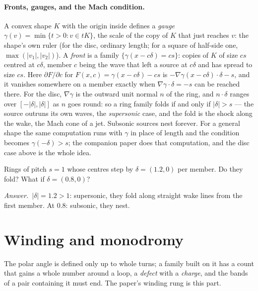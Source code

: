\documentclass[10pt]{article}
\theoremstyle{plain}
\theoremstyle{definition}
\newcommand{\answer}{\par\smallskip\noindent\textit{Answer.}\ }
\begin{document}
\paragraph{Fronts, gauges, and the Mach condition.}
A convex shape $K$ with the origin inside defines a \emph{gauge}
$\gamma(v)=\min\{t>0: v\in tK\}$, the scale of the copy of $K$ that just
reaches $v$: the shape's own ruler (for the disc, ordinary length; for a
square of half-side one, $\max(|v_1|,|v_2|)$). A \emph{front} is a family
$\{\gamma(x-c\delta)=cs\}$: copies of $K$ of size $cs$ centred at $c\delta$,
member $c$ being the wave that left a source at $c\delta$ and has spread
to size $cs$. Here $\partial F/\partial c$ for $F(x,c)=\gamma(x-c\delta)-cs$
is $-\nabla\gamma(x-c\delta)\cdot\delta-s$, and it vanishes somewhere on a
member exactly when $\nabla\gamma\cdot\delta=-s$ can be reached there. For
the disc, $\nabla\gamma$ is the outward unit normal $n$ of the ring, and
$n\cdot\delta$ ranges over $[-|\delta|,|\delta|]$ as $n$ goes round: so a
ring family folds if and only if $|\delta|>s$ --- the source outruns its
own waves, the \emph{supersonic} case, and the fold is the shock along the
wake, the Mach cone of a jet. Subsonic sources nest forever. For a general
shape the same computation runs with $\gamma$ in place of length and the
condition becomes $\gamma(-\delta)>s$; the companion paper does that
computation, and the disc case above is the whole idea.

\begin{checkyourself}
Rings of pitch $s=1$ whose centres step by $\delta=(1.2,0)$ per member. Do
they fold? What if $\delta=(0.8,0)$?
\answer $|\delta|=1.2>1$: supersonic, they fold along straight wake lines
from the first member. At $0.8$: subsonic, they nest.
\end{checkyourself}

\section{Winding and monodromy}
\label{p:winding}

\begin{why}
The polar angle is defined only up to whole turns; a family built on it has
a count that gains a whole number around a loop, a \emph{defect} with a
\emph{charge}, and the bands of a pair containing it must end. The paper's
winding rung is this part.
\end{why}
\end{document}
